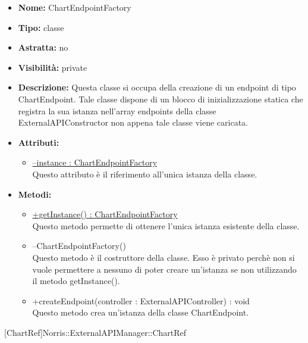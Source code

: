 			
			\begin{itemize}
			\item \textbf{Nome:} ChartEndpointFactory
			\item \textbf{Tipo:} classe
			
		\item \textbf{Astratta:}
		no
			\item \textbf{Visibilità:} private
			\item \textbf{Descrizione:} Questa classe si occupa della creazione di un endpoint di tipo ChartEndpoint.  Tale classe dispone di un blocco di inizializzazione statica che registra la sua istanza nell'array endpoints della classe ExternalAPIConstructor non appena tale classe viene caricata.
			\item \textbf{Attributi:}
				\begin{itemize}
				\setlength{\itemsep}{5pt}
				
					\item[\ding{111}] \underline{--instance : ChartEndpointFactory} \\ [1mm] Questo attributo è il riferimento all'unica istanza della classe.
				\end{itemize}
		
			\item \textbf{Metodi:}
				\begin{itemize}
				\setlength{\itemsep}{5pt}
				
					\item[\ding{111}] {\underline{+getInstance() : ChartEndpointFactory}} \\ [1mm] Questo metodo permette di ottenere l'unica istanza esistente della classe.
					\item[\ding{111}] {{--ChartEndpointFactory()}} \\ [1mm] Questo metodo è il costruttore della classe. Esso è privato perchè non si vuole permettere a nessuno di poter creare un’istanza se non utilizzando il metodo getInstance().

					\item[\ding{111}] {{+createEndpoint(controller : ExternalAPIController) : void}} \\ [1mm] Questo metodo crea un'istanza della classe ChartEndpoint.
				\end{itemize}
		
			\end{itemize}

			
			[ChartRef]{Norris::ExternalAPIManager::ChartRef}
			


